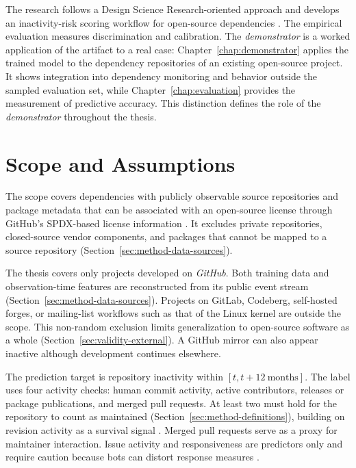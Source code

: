 The research follows a Design Science Research-oriented approach and develops an
inactivity-risk scoring workflow for open-source dependencies
\cite{hevner2004design,peffers2007design}. The empirical evaluation measures
discrimination and calibration. The \emph{demonstrator} is a worked application
of the artifact to a real case: Chapter~\ref{chap:demonstrator} applies the
trained model to the dependency repositories of an existing open-source project.
It shows integration into dependency monitoring and behavior outside the sampled
evaluation set, while
Chapter~\ref{chap:evaluation} provides the measurement of predictive
accuracy. This distinction defines the role of the \emph{demonstrator}
throughout the thesis.

\section{Scope and Assumptions}
\label{sec:intro-scope}

The scope covers dependencies with publicly observable source repositories and
package metadata that can be associated with an open-source license through
GitHub's SPDX-based license information \cite{githubRestLicenses}. It excludes
private repositories, closed-source vendor components, and packages that cannot
be mapped to a source repository (Section~\ref{sec:method-data-sources}).

The thesis covers only projects developed on \emph{GitHub}. Both training data
and observation-time features are reconstructed from its public event stream
(Section~\ref{sec:method-data-sources}). Projects on GitLab, Codeberg,
self-hosted forges, or mailing-list workflows such as that of the Linux kernel
are outside the scope. This non-random exclusion limits generalization to
open-source software as a whole (Section~\ref{sec:validity-external}). A GitHub
mirror can also appear inactive although development continues
elsewhere.

The prediction target is repository inactivity within
\( [t, t + 12\ \text{months}] \). The label uses four activity checks: human
commit activity, active contributors, releases or package publications, and
merged pull requests. At least two must hold for the repository to count as
maintained (Section~\ref{sec:method-definitions}), building on revision activity
as a survival signal \cite{robinson2022survival}. Merged pull requests serve as a
proxy for maintainer interaction. Issue activity and responsiveness are
predictors only and require caution because bots can distort response measures
\cite{hasan2023firstresponse}.

